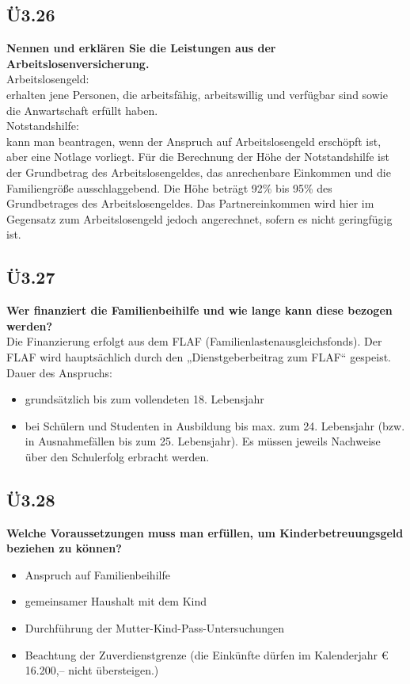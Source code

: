 	\subsection{Ü3.26}
		\textbf{Nennen und erklären Sie die Leistungen aus der Arbeitslosenversicherung.} \\
		Arbeitslosengeld:\\
		erhalten jene Personen, die arbeitsfähig, arbeitswillig und verfügbar sind sowie die Anwartschaft
		erfüllt haben. \\
		Notstandshilfe: \\
		kann man beantragen, wenn der Anspruch auf Arbeitslosengeld erschöpft ist, aber eine Notlage vorliegt.
		Für die Berechnung der Höhe der Notstandshilfe ist der Grundbetrag des Arbeitslosengeldes, das anrechenbare
		Einkommen und die Familiengröße ausschlaggebend. Die Höhe beträgt 92\% bis 95\% des Grundbetrages des Arbeitslosengeldes.
		Das Partnereinkommen wird hier im Gegensatz zum Arbeitslosengeld jedoch angerechnet, sofern es nicht
		geringfügig ist.
	
	\subsection{Ü3.27}
		\textbf{Wer finanziert die Familienbeihilfe und wie lange kann diese bezogen werden? }\\
		Die Finanzierung erfolgt aus dem FLAF (Familienlastenausgleichsfonds). Der FLAF wird hauptsächlich durch den „Dienstgeberbeitrag
		zum FLAF“ gespeist. \\
		Dauer des Anspruchs:
		\begin{itemize}
			\item grundsätzlich bis zum vollendeten 18. Lebensjahr 
			\item bei Schülern und Studenten in Ausbildung bis max. zum 24. Lebensjahr (bzw. in Ausnahmefällen bis zum 25. Lebensjahr).
			Es müssen jeweils Nachweise über den Schulerfolg erbracht werden.
		\end{itemize}
		
	\subsection{Ü3.28}
		\textbf{Welche Voraussetzungen muss man erfüllen, um Kinderbetreuungsgeld beziehen zu können? }
		\begin{itemize}
			\item 	Anspruch auf Familienbeihilfe
			\item	gemeinsamer Haushalt mit dem Kind
			\item 	Durchführung der Mutter-Kind-Pass-Untersuchungen
			\item 	Beachtung der Zuverdienstgrenze (die Einkünfte dürfen im Kalenderjahr € 16.200,– nicht übersteigen.)
		\end{itemize}
		
